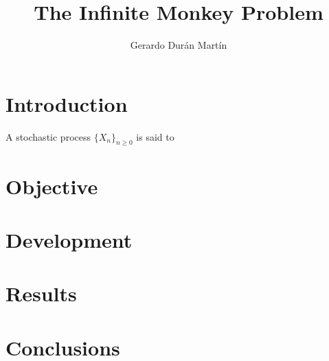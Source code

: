 \documentclass{report}
\title{The Infinite Monkey Problem}
\author{Gerardo Durán Martín}
\begin{document}
\maketitle
\tableofcontents{}

\newpage

\section{Introduction}
A stochastic process $\{X_n\}_{n\geq 0}$ is said to 
\section{Objective}
\section{Development}
\section{Results}
\section{Conclusions}
\end{document}
